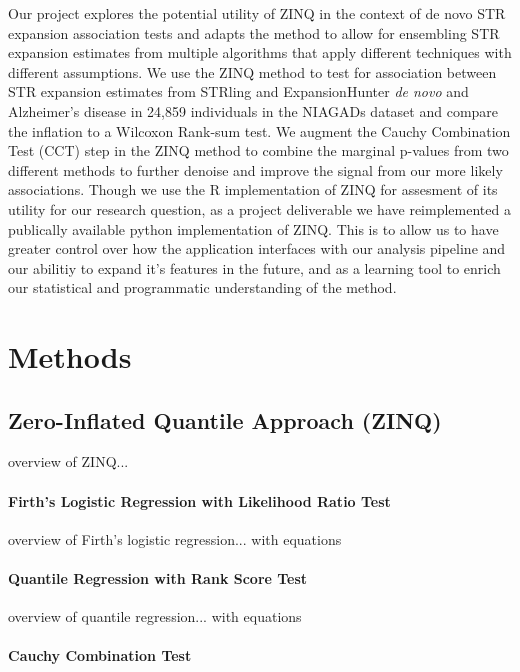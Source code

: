 \documentclass[unnumsec,webpdf,contemporary,large]{oup-authoring-template}%
\theoremstyle{thmstyleone}%
\theoremstyle{thmstyletwo}%
\theoremstyle{thmstylethree}%
\begin{document}
Our project explores the potential utility of ZINQ in the context of de novo STR expansion 
association tests and adapts the method to allow for ensembling STR expansion estimates from
multiple  algorithms that apply different techniques with different assumptions. We use the 
ZINQ method to test for association between STR expansion estimates from STRling and
ExpansionHunter \emph{de novo} and Alzheimer's disease in 24,859 individuals in the
NIAGADs dataset and compare the inflation to a Wilcoxon Rank-sum test. We augment the Cauchy
Combination Test (CCT) step in the ZINQ method to combine the marginal p-values from 
two different methods to further denoise and improve the signal from our more likely associations.
Though we use the R implementation of ZINQ for assesment of its utility for our research question,
as a project deliverable we have reimplemented a publically available python implementation of ZINQ.
This is to allow us to have greater control over how the application interfaces with our analysis
pipeline and our abilitiy to expand it's features in the future, and as a learning tool to
enrich our statistical and programmatic understanding of the method.

\section{Methods}

\subsection{Zero-Inflated Quantile Approach (ZINQ)}\label{subsec2}

overview of ZINQ...

\paragraph{Firth's Logistic Regression with Likelihood Ratio Test}

overview of Firth's logistic regression... with equations

\paragraph{Quantile Regression with Rank Score Test}

overview of quantile regression... with equations

\paragraph{Cauchy Combination Test}
\end{document}
